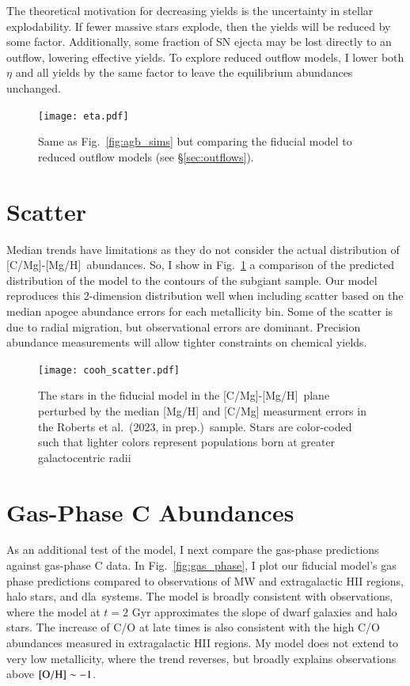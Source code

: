 \documentclass[12pt,oneside,letterpaper]{report}
\newcommand{\dla}{\gls{dla}}
\newcommand{\apogee}{\gls{apogee}}
\newcommand{\caah}{[C/Mg]-[Mg/H]}
\newcommand{\citetjack}{Roberts et al.~(2023, in prep.)}
\begin{document}
The theoretical motivation for decreasing yields is the uncertainty in stellar explodability.
If fewer massive stars explode, then the yields will be reduced by some factor. Additionally, some fraction of SN ejecta may be lost directly to an outflow, lowering effective yields. To explore reduced outflow models, I lower both $\eta$ and all yields by the same factor to leave the equilibrium abundances unchanged. 

\begin{figure}

\texttt{[image: eta.pdf]}

\caption[Reduced-outflow models]{Same as Fig.~\ref{fig:agb_sims} but comparing the fiducial model to reduced outflow models (see \S \ref{sec:outflows}).}
\end{figure}


\section{Scatter}

Median trends have limitations as they do not consider the actual distribution of \caah~abundances. So, I show in Fig.~\ref{fig:scatter} a comparison of the predicted distribution of the model to the contours of the subgiant sample. Our model reproduces this 2-dimension distribution well when including scatter based on the median \apogee{} abundance errors for each metallicity bin. Some of the scatter is due to radial migration, but observational errors are dominant. Precision abundance measurements will allow tighter constraints on chemical yields. 

\begin{figure}
    \centering
    \texttt{[image: cooh\_scatter.pdf]}
    \caption[Scatter agreement]{The stars in the fiducial model in the \caah~plane perturbed by the median [Mg/H] and [C/Mg] measurment errors in the \citetjack~sample. Stars are color-coded such that lighter colors represent populations born at greater galactocentric radii
    }
    \label{fig:scatter}
\end{figure}



\section{Gas-Phase C Abundances}\label{sec:gas}

As an additional test of the model, I next compare the gas-phase predictions against gas-phase C data. In Fig.~\ref{fig:gas_phase}, I plot our fiducial model's gas phase predictions compared to observations of MW and extragalactic HII regions, halo stars, and \dla\ systems. The model is broadly consistent with observations, where the model at $t=2$ Gyr approximates the slope of dwarf galaxies and halo stars. The increase of C/O at late times is also consistent with the high C/O abundances measured in extragalactic HII regions. 
My model does not extend to very low metallicity, where the trend reverses, but broadly explains observations above $\rm [O/H] \sim -1$. 
\end{document}
